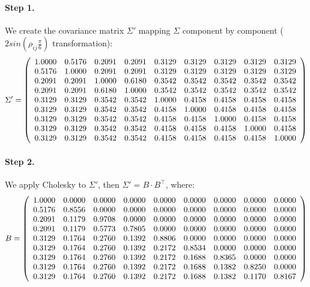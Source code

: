 \documentclass[a4paper,12pt,final]{article}
\begin{document}
\paragraph{Step 1.} We create the covariance matrix $\Sigma'$ mapping 
$\Sigma$ component by component ($2 sin(\rho_{ij} \frac{\pi}{6})$ 
transformation):
\begin{displaymath}
\Sigma' = \left( 
\begin{array}{ccccccccc}
   1.0000 & 0.5176 & 0.2091 & 0.2091 & 0.3129 & 0.3129 & 0.3129 & 0.3129 & 0.3129 \cr
   0.5176 & 1.0000 & 0.2091 & 0.2091 & 0.3129 & 0.3129 & 0.3129 & 0.3129 & 0.3129 \cr
   0.2091 & 0.2091 & 1.0000 & 0.6180 & 0.3542 & 0.3542 & 0.3542 & 0.3542 & 0.3542 \cr
   0.2091 & 0.2091 & 0.6180 & 1.0000 & 0.3542 & 0.3542 & 0.3542 & 0.3542 & 0.3542 \cr
   0.3129 & 0.3129 & 0.3542 & 0.3542 & 1.0000 & 0.4158 & 0.4158 & 0.4158 & 0.4158 \cr
   0.3129 & 0.3129 & 0.3542 & 0.3542 & 0.4158 & 1.0000 & 0.4158 & 0.4158 & 0.4158 \cr
   0.3129 & 0.3129 & 0.3542 & 0.3542 & 0.4158 & 0.4158 & 1.0000 & 0.4158 & 0.4158 \cr
   0.3129 & 0.3129 & 0.3542 & 0.3542 & 0.4158 & 0.4158 & 0.4158 & 1.0000 & 0.4158 \cr
   0.3129 & 0.3129 & 0.3542 & 0.3542 & 0.4158 & 0.4158 & 0.4158 & 0.4158 & 1.0000 \cr
\end{array}
\right)
\end{displaymath}

\paragraph{Step 2.} We apply Cholesky to $\Sigma'$, then $\Sigma' = B \cdot B^{\top}$, 
where:
\begin{displaymath}
B = 
\left(
\begin{array}{ccccccccc}
   1.0000 & 0.0000 & 0.0000 & 0.0000 & 0.0000 & 0.0000 & 0.0000 & 0.0000 & 0.0000 \cr
   0.5176 & 0.8556 & 0.0000 & 0.0000 & 0.0000 & 0.0000 & 0.0000 & 0.0000 & 0.0000 \cr
   0.2091 & 0.1179 & 0.9708 & 0.0000 & 0.0000 & 0.0000 & 0.0000 & 0.0000 & 0.0000 \cr
   0.2091 & 0.1179 & 0.5773 & 0.7805 & 0.0000 & 0.0000 & 0.0000 & 0.0000 & 0.0000 \cr
   0.3129 & 0.1764 & 0.2760 & 0.1392 & 0.8806 & 0.0000 & 0.0000 & 0.0000 & 0.0000 \cr
   0.3129 & 0.1764 & 0.2760 & 0.1392 & 0.2172 & 0.8534 & 0.0000 & 0.0000 & 0.0000 \cr
   0.3129 & 0.1764 & 0.2760 & 0.1392 & 0.2172 & 0.1688 & 0.8365 & 0.0000 & 0.0000 \cr
   0.3129 & 0.1764 & 0.2760 & 0.1392 & 0.2172 & 0.1688 & 0.1382 & 0.8250 & 0.0000 \cr
   0.3129 & 0.1764 & 0.2760 & 0.1392 & 0.2172 & 0.1688 & 0.1382 & 0.1170 & 0.8167 \cr
\end{array}
\right)
\end{displaymath}
\end{document}
